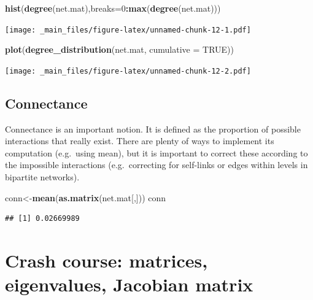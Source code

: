 \documentclass[
]{book}
\newenvironment{Shaded}{\begin{snugshade}}{\end{snugshade}}
\newcommand{\AttributeTok}[1]{\textcolor[rgb]{0.13,0.29,0.53}{#1}}
\newcommand{\ConstantTok}[1]{\textcolor[rgb]{0.56,0.35,0.01}{#1}}
\newcommand{\DecValTok}[1]{\textcolor[rgb]{0.00,0.00,0.81}{#1}}
\newcommand{\FunctionTok}[1]{\textcolor[rgb]{0.13,0.29,0.53}{\textbf{#1}}}
\newcommand{\NormalTok}[1]{#1}
\newcommand{\OtherTok}[1]{\textcolor[rgb]{0.56,0.35,0.01}{#1}}
\newcommand{\SpecialCharTok}[1]{\textcolor[rgb]{0.81,0.36,0.00}{\textbf{#1}}}
\theoremstyle{definition}
\theoremstyle{definition}
\theoremstyle{definition}
\theoremstyle{definition}
\theoremstyle{remark}
\begin{document}
\begin{Shaded}
\begin{Highlighting}[]
\FunctionTok{hist}\NormalTok{(}\FunctionTok{degree}\NormalTok{(net.mat),}\AttributeTok{breaks=}\DecValTok{0}\SpecialCharTok{:}\FunctionTok{max}\NormalTok{(}\FunctionTok{degree}\NormalTok{(net.mat)))}
\end{Highlighting}
\end{Shaded}

\texttt{[image: \_main\_files/figure-latex/unnamed-chunk-12-1.pdf]}

\begin{Shaded}
\begin{Highlighting}[]
\FunctionTok{plot}\NormalTok{(}\FunctionTok{degree\_distribution}\NormalTok{(net.mat, }\AttributeTok{cumulative =} \ConstantTok{TRUE}\NormalTok{))}
\end{Highlighting}
\end{Shaded}

\texttt{[image: \_main\_files/figure-latex/unnamed-chunk-12-2.pdf]}

\subsection{Connectance}\label{connectance}

Connectance is an important notion. It is defined as the proportion of possible interactions that really exist. There are plenty of ways to implement its computation (e.g.~using mean), but it is important to correct these according to the impossible interactions (e.g.~correcting for self-links or edges within levels in bipartite networks).

\begin{Shaded}
\begin{Highlighting}[]
\NormalTok{conn}\OtherTok{\textless{}{-}}\FunctionTok{mean}\NormalTok{(}\FunctionTok{as.matrix}\NormalTok{(net.mat[,]))}
\NormalTok{conn}
\end{Highlighting}
\end{Shaded}

\begin{verbatim}
## [1] 0.02669989
\end{verbatim}

\section{Crash course: matrices, eigenvalues, Jacobian matrix}\label{crash-course-matrices-eigenvalues-jacobian-matrix}
\end{document}
